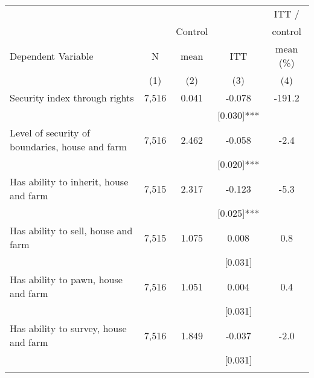 \begin{tabular}{lcccc}
\hline \noalign{\smallskip} &  &  &  & ITT /\\
 &  & Control &  & control\\
Dependent Variable & N & mean & ITT & mean (\%)\\
 & (1) & (2) & (3) & (4)\\
\noalign{\smallskip}\hline \noalign{\smallskip}Security index through rights & 7,516 & 0.041 & -0.078 & -191.2\\
 &  &  & [0.030]*** & \\
\quad Level of security of boundaries, house and farm & 7,516 & 2.462 & -0.058 & -2.4\\
 &  &  & [0.020]*** & \\
\quad Has ability to inherit, house and farm & 7,515 & 2.317 & -0.123 & -5.3\\
 &  &  & [0.025]*** & \\
\quad Has ability to sell, house and farm & 7,515 & 1.075 & 0.008 & 0.8\\
 &  &  & [0.031] & \\
\quad Has ability to pawn, house and farm & 7,516 & 1.051 & 0.004 & 0.4\\
 &  &  & [0.031] & \\
\quad Has ability to survey, house and farm & 7,516 & 1.849 & -0.037 & -2.0\\
 &  &  & [0.031] & \\
\noalign{\smallskip}\hline\end{tabular}
